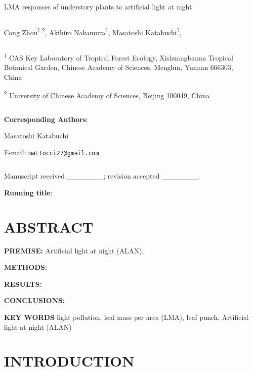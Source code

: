 \documentclass[
]{article}
\author{}
\date{\vspace{-2.5em}}
\begin{document}
{
\setcounter{tocdepth}{2}
\tableofcontents
}
\newpage

LMA responses of understory plants to artificial light at night

\[ \]

Cong Zhou\textsuperscript{1,2}, Akihiro Nakamura\textsuperscript{1},
Masatoshi Katabuchi\textsuperscript{1},

\[ \]

\textsuperscript{1} CAS Key Laboratory of Tropical Forest Ecology,
Xishuangbanna Tropical Botanical Garden, Chinese Academy of Sciences,
Menglun, Yunnan 666303, China

\textsuperscript{2} University of Chinese Academy of Sciences, Beijing
100049, China

\[ \]

\textbf{Corresponding Authors}:

Masatoshi Katabuchi

E-mail:
\href{mailto:mattocci27@gmail.com}{\nolinkurl{mattocci27@gmail.com}}

\[ \]

Manuscript received \_\_\_\_\_\_\_; revision accepted \_\_\_\_\_\_\_.

\textbf{Running title}:

\newpage

\hypertarget{abstract}{%
\section{ABSTRACT}\label{abstract}}

\textbf{PREMISE:} Artificial light at night (ALAN),

\textbf{METHODS:}

\textbf{RESULTS:}

\textbf{CONCLUSIONS:}

\textbf{KEY WORDS} light pollution, leaf mass per area (LMA), leaf
punch, Artificial light at night (ALAN)

\hypertarget{introduction}{%
\section{INTRODUCTION}\label{introduction}}
\end{document}

